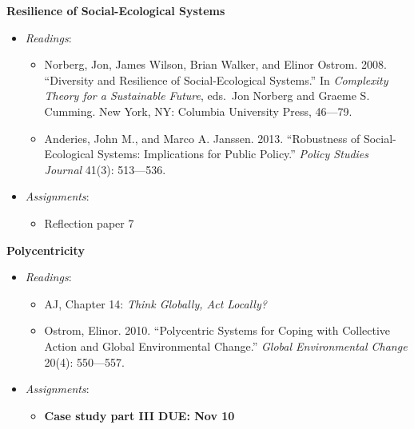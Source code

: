 \week \textbf{Resilience of Social-Ecological Systems}

\begin{itemize}

\item
  \emph{Readings}:

  \begin{itemize}
  
  \item
    Norberg, Jon, James Wilson, Brian Walker, and Elinor Ostrom. 2008.
    ``Diversity and Resilience of Social-Ecological Systems.'' In
    \emph{Complexity Theory for a Sustainable Future}, eds.~Jon Norberg
    and Graeme S. Cumming. New York, NY: Columbia University Press,
    46---79.
  \item
    Anderies, John M., and Marco A. Janssen. 2013. ``Robustness of
    Social-Ecological Systems: Implications for Public Policy.''
    \emph{Policy Studies Journal} 41(3): 513---536.
  \end{itemize}
\item
  \emph{Assignments}:

  \begin{itemize}
  
  \item
    Reflection paper 7
  \end{itemize}
\end{itemize}

\week \textbf{Polycentricity}

\begin{itemize}

\item
  \emph{Readings}:

  \begin{itemize}
  
  \item
    AJ, Chapter 14: \emph{Think Globally, Act Locally?}
  \item
    Ostrom, Elinor. 2010. ``Polycentric Systems for Coping with
    Collective Action and Global Environmental Change.'' \emph{Global
    Environmental Change} 20(4): 550---557.
  \end{itemize}
\item
  \emph{Assignments}:

  \begin{itemize}
  
  \item
    \textbf{Case study part III DUE: Nov 10}
  \end{itemize}
\end{itemize}

